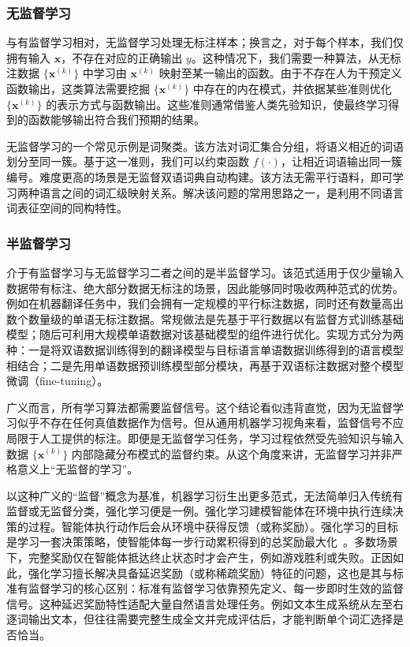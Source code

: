\subsubsection{无监督学习}
与有监督学习相对，无监督学习处理无标注样本；换言之，对于每个样本，我们仅拥有输入 $\mathbf{x}$，不存在对应的正确输出 $y$。这种情况下，我们需要一种算法，从无标注数据 $\{\mathbf{x}^{(k)}\}$ 中学习由 $\mathbf{x}^{(k)}$ 映射至某一输出的函数。由于不存在人为干预定义函数输出，这类算法需要挖掘 $\{\mathbf{x}^{(k)}\}$ 中存在的内在模式，并依据某些准则优化 $\{\mathbf{x}^{(k)}\}$ 的表示方式与函数输出。这些准则通常借鉴人类先验知识，使最终学习得到的函数能够输出符合我们预期的结果。

无监督学习的一个常见示例是词聚类。该方法对词汇集合分组，将语义相近的词语划分至同一簇。基于这一准则，我们可以约束函数 $f(\cdot)$，让相近词语输出同一簇编号。难度更高的场景是无监督双语词典自动构建。该方法无需平行语料，即可学习两种语言之间的词汇级映射关系。解决该问题的常用思路之一，是利用不同语言词表征空间的同构特性。

\subsubsection{半监督学习}
介于有监督学习与无监督学习二者之间的是半监督学习。该范式适用于仅少量输入数据带有标注、绝大部分数据无标注的场景，因此能够同时吸收两种范式的优势。例如在机器翻译任务中，我们会拥有一定规模的平行标注数据，同时还有数量高出数个数量级的单语无标注数据。常规做法是先基于平行数据以有监督方式训练基础模型；随后可利用大规模单语数据对该基础模型的组件进行优化。实现方式分为两种：一是将双语数据训练得到的翻译模型与目标语言单语数据训练得到的语言模型相结合；二是先用单语数据预训练模型部分模块，再基于双语标注数据对整个模型微调（fine-tuning）。

广义而言，所有学习算法都需要监督信号。这个结论看似违背直觉，因为无监督学习似乎不存在任何真值数据作为信号。但从通用机器学习视角来看，监督信号不应局限于人工提供的标注。即便是无监督学习任务，学习过程依然受先验知识与输入数据 $\{\mathbf{x}^{(k)}\}$ 内部隐藏分布模式的监督约束。从这个角度来讲，无监督学习并非严格意义上“无监督的学习”。

以这种广义的“监督”概念为基准，机器学习衍生出更多范式，无法简单归入传统有监督或无监督分类，强化学习便是一例。强化学习建模智能体在环境中执行连续决策的过程。智能体执行动作后会从环境中获得反馈（或称奖励）。强化学习的目标是学习一套决策策略，使智能体每一步行动累积得到的总奖励最大化~\cite{SuttonBarto2018RL}。多数场景下，完整奖励仅在智能体抵达终止状态时才会产生，例如游戏胜利或失败。正因如此，强化学习擅长解决具备延迟奖励（或称稀疏奖励）特征的问题，这也是其与标准有监督学习的核心区别：标准有监督学习依靠预先定义、每一步即时生效的监督信号。这种延迟奖励特性适配大量自然语言处理任务。例如文本生成系统从左至右逐词输出文本，但往往需要完整生成全文并完成评估后，才能判断单个词汇选择是否恰当。

